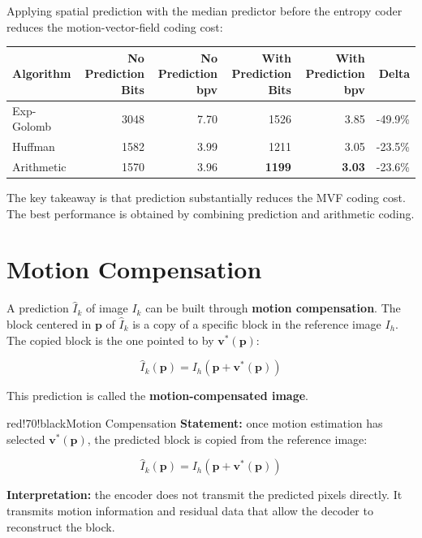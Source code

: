 Applying spatial prediction with the median predictor before the entropy coder reduces the motion-vector-field coding cost:

\begin{center}
\begin{tabular}{|l|r|r|r|r|r|}
\hline
\textbf{Algorithm} & \textbf{No Prediction Bits} & \textbf{No Prediction bpv} & \textbf{With Prediction Bits} & \textbf{With Prediction bpv} & \textbf{Delta} \\ \hline
Exp-Golomb & 3048 & 7.70 & 1526 & 3.85 & -49.9\% \\ \hline
Huffman & 1582 & 3.99 & 1211 & 3.05 & -23.5\% \\ \hline
Arithmetic & 1570 & 3.96 & \textbf{1199} & \textbf{3.03} & -23.6\% \\ \hline
\end{tabular}
\end{center}

The key takeaway is that prediction substantially reduces the MVF coding cost. The best performance is obtained by combining prediction and arithmetic coding.

\section{Motion Compensation}

A prediction $\hat{I}_k$ of image $I_k$ can be built through \textbf{motion compensation}. The block centered in $\mathbf{p}$ of $\hat{I}_k$ is a copy of a specific block in the reference image $I_h$. The copied block is the one pointed to by $\mathbf{v}^*(\mathbf{p})$:

\[
\hat{I}_k(\mathbf{p}) = I_h\left(\mathbf{p} + \mathbf{v}^*(\mathbf{p})\right)
\]

This prediction is called the \textbf{motion-compensated image}.

\begin{calloutbox}{red!70!black}{Motion Compensation}
\textbf{Statement:} once motion estimation has selected $\mathbf{v}^*(\mathbf{p})$, the predicted block is copied from the reference image:

\[
\hat{I}_k(\mathbf{p}) = I_h\left(\mathbf{p} + \mathbf{v}^*(\mathbf{p})\right)
\]

\textbf{Interpretation:} the encoder does not transmit the predicted pixels directly. It transmits motion information and residual data that allow the decoder to reconstruct the block.
\end{calloutbox}

